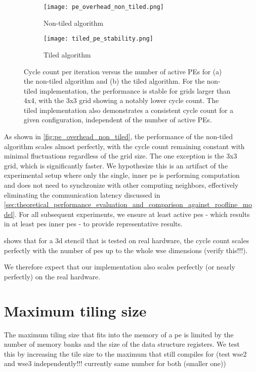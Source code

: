 \begin{figure}[h]
    \centering
    \begin{subfigure}[b]{0.48\textwidth}
        \centering
        \texttt{[image: pe\_overhead\_non\_tiled.png]}
        \caption{Non-tiled algorithm}
        \label{fig:pe_overhead_non_tiled}
    \end{subfigure}
    \hfill
    \begin{subfigure}[b]{0.48\textwidth}
        \centering
        \texttt{[image: tiled\_pe\_stability.png]}
        \caption{Tiled algorithm}
        \label{fig:tiled_pe_stability}
    \end{subfigure}
    \caption{Cycle count per iteration versus the number of active PEs for (a) the non-tiled algorithm and (b) the tiled algorithm. For the non-tiled implementation, the performance is stable for grids larger than 4x4, with the 3x3 grid showing a notably lower cycle count. The tiled implementation also demonstrates a consistent cycle count for a given configuration, independent of the number of active PEs.}
    \label{fig:pe_overhead}
\end{figure}

As shown in \autoref{fig:pe_overhead_non_tiled}, the performance of the non-tiled algorithm scales almost perfectly, with the cycle count remaining constant with minimal fluctuations regardless of the grid size. The one exception is the 3x3 grid, which is significantly faster. We hypothesize this is an artifact of the experimental setup where only the single, inner \ac{pe} is performing computation and does not need to synchronize with other computing neighbors, effectively eliminating the communication latency discussed in \autoref{sec:theoretical_performance_evaluation_and_comparison_against_roofline_model}. For all subsequent experiments, we ensure at least  active \acp{pe} - which results in at least  \acp{pe} inner \acp{pe} - to provide representative results.

\cite{source} shows that for a 3d stencil that is tested on real hardware, the cycle count scales perfectly with the number of \acp{pe} up to the whole \ac{wse} dimensions (verify this!!!).

We therefore expect that our implementation also scales perfectly (or nearly perfectly) on the real hardware.



\section{Maximum tiling size}
The maximum tiling size that fits into the memory of a \ac{pe} is limited by the number of memory banks and the size of the data structure registers.
We test this by increasing the tile size to the maximum that still compiles for (test wse2 and wse3 independently!!! currently same number for both (smaller one))

